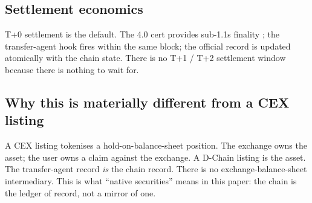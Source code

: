 \subsection{Settlement economics}

T+0 settlement is the default. The \Quasar{} 4.0 cert provides
sub-1.1s finality \cite{lp-020}; the transfer-agent hook fires within
the same block; the official record is updated atomically with the
chain state. There is no T+1 / T+2 settlement window because there
is nothing to wait for.

\subsection{Why this is materially different from a CEX listing}

A CEX listing tokenises a hold-on-balance-sheet position. The
exchange owns the asset; the user owns a claim against the exchange.
A \Zoo{} D-Chain listing is the asset. The transfer-agent record
\emph{is} the chain record. There is no exchange-balance-sheet
intermediary. This is what ``native securities'' means in this
paper: the chain is the ledger of record, not a mirror of one.

